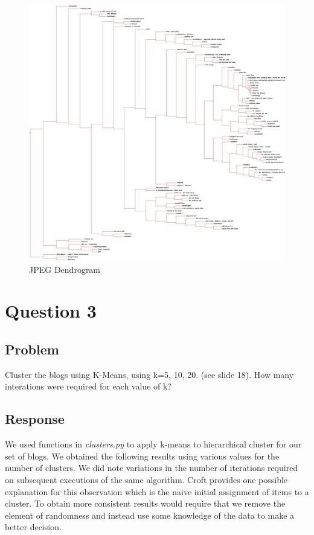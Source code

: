 \documentclass[letterpaper,11pt]{report}
\begin{document}
\begin{savenotes}
\begin{figure}
	\centering
		\includegraphics[width=1.00\textwidth]{blogclust.jpg}
	\caption{JPEG Dendrogram}
	\label{fig:blogclust}
\end{figure}

\section{Question 3}
\subsection{Problem}Cluster the blogs using K-Means, using k=5, 10, 20. (see slide 18). How many interations were required for each value of k?
\subsection{Response}We used functions in \emph{clusters.py} to apply k-means to hierarchical cluster for our set of blogs. We obtained the following results using various values for the number of clusters. We did note variations in the number of iterations required on subsequent executions of the same algorithm. Croft \cite{croft2010search} provides one possible explanation for this observation which is the naive initial assignment of items to a cluster. To obtain more consistent results would require that we remove the element of randomness and instead use some knowledge of the data to make a better decision.


\end{savenotes}
\end{document}
